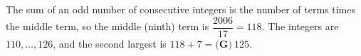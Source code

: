 The sum of an odd number of consecutive integers is the number of terms times the middle term, so the middle (ninth) term is $\dfrac{2006}{17}=118$. The integers are $110,\dots,126$, and the second largest is $118+7=\boxed{\textbf{(G)}\ 125}$.

